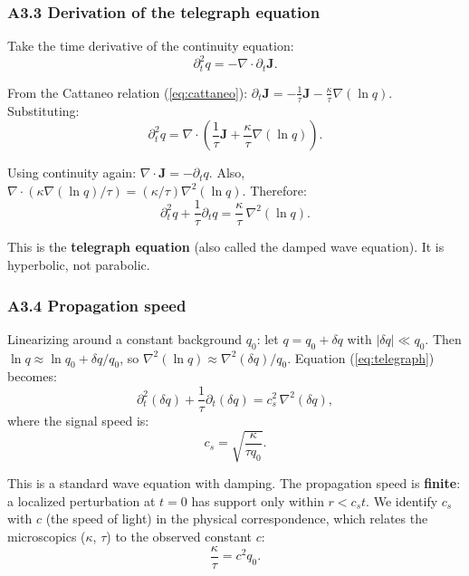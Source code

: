 \documentclass[reprint]{revtex4-2}
\begin{document}
\subsubsection{A3.3 Derivation of the telegraph equation}

Take the time derivative of the continuity equation:
\begin{equation}
\partial_t^2 q = -\nabla\cdot\partial_t\mathbf{J}.
\end{equation}

From the Cattaneo relation (\ref{eq:cattaneo}): $\partial_t\mathbf{J} = -\frac{1}{\tau}\mathbf{J} - \frac{\kappa}{\tau}\nabla(\ln q)$. Substituting:
\begin{equation}
\partial_t^2 q = \nabla\cdot\left(\frac{1}{\tau}\mathbf{J} + \frac{\kappa}{\tau}\nabla(\ln q)\right).
\end{equation}

Using continuity again: $\nabla\cdot\mathbf{J} = -\partial_t q$. Also, $\nabla\cdot(\kappa\nabla(\ln q)/\tau) = (\kappa/\tau)\nabla^2(\ln q)$. Therefore:
\begin{equation}
\boxed{\partial_t^2 q + \frac{1}{\tau}\partial_t q = \frac{\kappa}{\tau}\,\nabla^2(\ln q)}.
\label{eq:telegraph}
\end{equation}

This is the \textbf{telegraph equation} (also called the damped wave equation). It is hyperbolic, not parabolic.

\subsubsection{A3.4 Propagation speed}

Linearizing around a constant background $q_0$: let $q = q_0 + \delta q$ with $|\delta q|\ll q_0$. Then $\ln q \approx \ln q_0 + \delta q/q_0$, so $\nabla^2(\ln q) \approx \nabla^2(\delta q)/q_0$. Equation (\ref{eq:telegraph}) becomes:
\begin{equation}
\partial_t^2(\delta q) + \frac{1}{\tau}\partial_t(\delta q) = c_s^2\,\nabla^2(\delta q),
\end{equation}
where the signal speed is:
\begin{equation}
c_s = \sqrt{\frac{\kappa}{\tau q_0}}.
\end{equation}

This is a standard wave equation with damping. The propagation speed is \textbf{finite}: a localized perturbation at $t=0$ has support only within $r < c_s t$. We identify $c_s$ with $c$ (the speed of light) in the physical correspondence, which relates the microscopics ($\kappa$, $\tau$) to the observed constant $c$:
\begin{equation}
\frac{\kappa}{\tau} = c^2 q_0.
\label{eq:micro_macro}
\end{equation}
\end{document}
